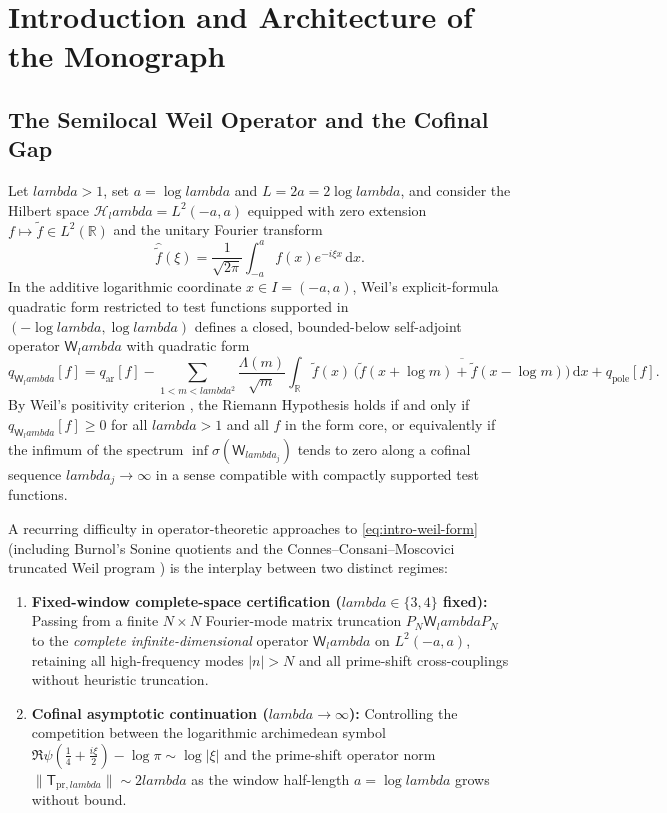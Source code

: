 \documentclass[11pt]{article}
\def\lambda{lambda}%
\theoremstyle{remark}
\newcommand{\dd}{\mathrm d}
\begin{document}
\tableofcontents
\newpage

\section{Introduction and Architecture of the Monograph}\label{sec:intro}

\subsection{The Semilocal Weil Operator and the Cofinal Gap}
Let $\lambda>1$, set $a=\log\lambda$ and $L=2a=2\log\lambda$, and consider the Hilbert space $\mathcal H_\lambda = L^2(-a,a)$ equipped with zero extension $f\mapsto \widetilde f\in L^2(\mathbb R)$ and the unitary Fourier transform
\[
 \widehat{\widetilde f}(\xi) = \frac{1}{\sqrt{2\pi}}\int_{-a}^{a} f(x)e^{-i\xi x}\,\dd x.
\]
In the additive logarithmic coordinate $x\in I=(-a,a)$, Weil's explicit-formula quadratic form restricted to test functions supported in $(-\log\lambda,\log\lambda)$ defines a closed, bounded-below self-adjoint operator $\mathsf W_\lambda$ with quadratic form
\begin{equation}\label{eq:intro-weil-form}
 q_{\mathsf W_\lambda}[f] = q_{\mathrm{ar}}[f] - \sum_{1<m<\lambda^2}\frac{\Lambda(m)}{\sqrt m}\int_{\mathbb R}\widetilde f(x)\,\overline{\bigl(\widetilde f(x+\log m)+\widetilde f(x-\log m)\bigr)}\,\dd x + q_{\mathrm{pole}}[f].
\end{equation}
By Weil's positivity criterion \cite{BurnolExplicit2000,ConnesConsaniMoscovici2025}, the Riemann Hypothesis holds if and only if $q_{\mathsf W_\lambda}[f]\ge 0$ for all $\lambda>1$ and all $f$ in the form core, or equivalently if the infimum of the spectrum $\inf\sigma(\mathsf W_{\lambda_j})$ tends to zero along a cofinal sequence $\lambda_j\to\infty$ in a sense compatible with compactly supported test functions.

A recurring difficulty in operator-theoretic approaches to \eqref{eq:intro-weil-form} (including Burnol's Sonine quotients \cite{BurnolExplicit2000,Burnol2002Sonine} and the Connes--Consani--Moscovici truncated Weil program \cite{ConnesConsaniMoscovici2025,ConnesVanSuijlekom2025}) is the interplay between two distinct regimes:
\begin{enumerate}[label=(\roman*)]
\item \textbf{Fixed-window complete-space certification ($\lambda\in\{3,4\}$ fixed):} Passing from a finite $N\times N$ Fourier-mode matrix truncation $P_N\mathsf W_\lambda P_N$ to the \emph{complete infinite-dimensional} operator $\mathsf W_\lambda$ on $L^2(-a,a)$, retaining all high-frequency modes $|n|>N$ and all prime-shift cross-couplings without heuristic truncation.
\item \textbf{Cofinal asymptotic continuation ($\lambda\to\infty$):} Controlling the competition between the logarithmic archimedean symbol $\Re\psi(\tfrac14+\tfrac{i\xi}{2})-\log\pi \sim \log|\xi|$ and the prime-shift operator norm $\|\mathsf T_{\mathrm{pr},\lambda}\|\sim 2\lambda$ as the window half-length $a=\log\lambda$ grows without bound.
\end{enumerate}
\end{document}
